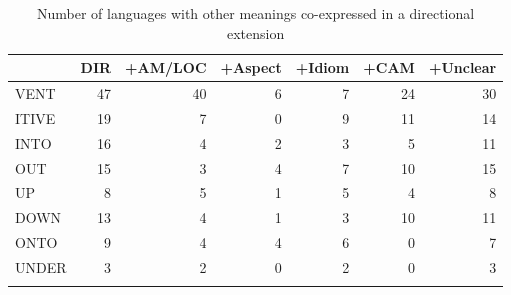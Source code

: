 \begin{table}
	\caption{Number of languages with other meanings co-expressed in a directional extension}
	\label{tab:DIR_plus}
	\begin{tabular}{lrrrrrr} %
		\lsptoprule
		{} &  DIR &  +AM/LOC &  +Aspect &  +Idiom &  +CAM &  +Unclear \\
		\midrule
VENT &   47 &                40 &                 6 &             7 &    24 &        30 \\
ITIVE &   19 &                 7 &                 0 &             9 &    11 &        14 \\
INTO &   16 &                 4 &                 2 &             3 &     5 &        11 \\
OUT &   15 &                 3 &                 4 &             7 &    10 &        15 \\
UP &    8 &                 5 &                 1 &             5 &     4 &         8 \\
DOWN &   13 &                 4 &                 1 &             3 &    10 &        11 \\
ONTO &    9 &                 4 &                 4 &             6 &     0 &         7 \\
UNDER &    3 &                 2 &                 0 &             2 &     0 &         3 \\
		\lspbottomrule

\end{tabular}
\end{table}

